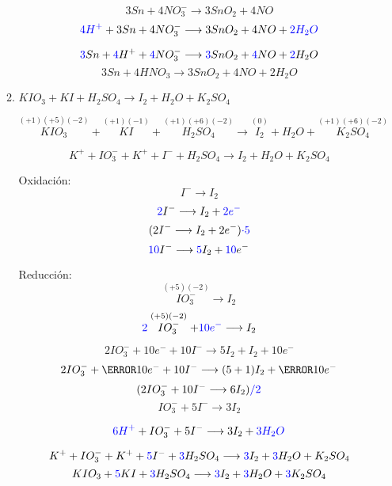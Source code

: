 \documentclass[../Práctica.root.tex]{subfiles}
\newcommand{\lra}{\ensuremath{\longrightarrow{}}}
\newcommand{\sr}[2]{\stackrel{#1}{#2}}
\begin{document}
\begin{enumerate}
\begin{enumerate}
                    \[ 3 Sn + 4 NO_3^- \lra 3 SnO_2 + 4 NO \]
                    \[ \blue{4H^+} + 3 Sn + 4 NO_3^- \lra 3 SnO_2 + 4 NO + \blue{2H_2O} \]

                    \[ \blue{3} Sn + \blue{4} H^+ + \blue{4} NO_3^- \lra \blue{3} SnO_2 + \blue{4} NO + \blue{2} H_2O \]
                    \[ 3 Sn + 4 HNO_3 \lra 3 SnO_2 + 4 NO + 2 H_2O \]

              \item $KIO_3 + KI + H_2SO_4 \lra I_2 + H_2O + K_2SO_4$

                    $\sr{(+1)(+5)(-2)}{KIO_3} + \sr{(+1)(-1)}{KI} + \sr{(+1)(+6)(-2)}{H_2SO_4}
                        \lra \sr{(0)}{I_2} + H_2O + \sr{(+1)(+6)(-2)}{K_2SO_4}$

                    \[ K^+ + IO_3^- + K^+ + I^- + H_2SO_4 \lra I_2 + H_2O + K_2SO_4 \]
                    \begin{multicols}{2}
                        Oxidación:
                        \[ I^- \lra I_2 \]
                        \[ \blue{2} I^- \lra I_2 + \blue{2e^-} \]
                        \[ (2 I^- \lra I_2 + 2e^-)\blue{\cdot 5} \]
                        \[ \blue{10} I^- \lra \blue{5} I_2 + \blue{10} e^- \]

                        \columnbreak

                        Reducción:
                        \[ \sr{(+5)(-2)}{IO_3^-} \lra I_2 \]
                        \[ \blue{2} \sr{(+5)(-2)}{IO_3^-} + \blue{10e^-} \lra I_2 \]
                    \end{multicols}

                    \[ 2 IO_3^- + 10 e^- + 10 I^- \lra 5 I_2 + I_2 + 10 e^- \]
                    \[ 2 IO_3^- + \cancel{10 e^-} + 10 I^- \lra (5 + 1) I_2 + \cancel{10 e^-} \]
                    \[ (2 IO_3^- + 10 I^- \lra 6 I_2)\blue{/2} \]
                    \[ IO_3^- + 5 I^- \lra 3 I_2 \]

                    \[ \blue{6H^+} + IO_3^- + 5 I^- \lra 3 I_2 + \blue{3H_2O} \]

                    \[ K^+ + IO_3^- + K^+ + \blue{5} I^- + \blue{3} H_2SO_4 \lra \blue{3} I_2 + \blue{3} H_2O + K_2SO_4 \]
                    \[ KIO_3 + \blue{5} KI + \blue{3} H_2SO_4 \lra \blue{3} I_2 + \blue{3} H_2O + \blue{3} K_2SO_4 \]


\end{enumerate}
\end{enumerate}
\end{document}
